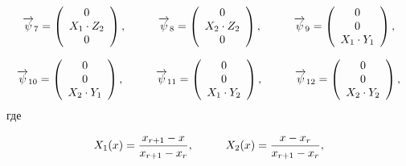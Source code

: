 \begin{equation*}
	\overrightarrow{\psi}_7 = \left(
	\begin{array}{c}
		0\\
		X_1 \cdot Z_2\\
		0\\
	\end{array}
	\right),
	\hspace{10mm}
	\overrightarrow{\psi}_8 = \left(
	\begin{array}{c}
		0\\
		X_2 \cdot Z_2\\
		0\\
	\end{array}
	\right),
	\hspace{10mm}
	\overrightarrow{\psi}_9 = \left(
	\begin{array}{c}
		0\\
		0\\
		X_1 \cdot Y_1\\
	\end{array}
	\right),
\end{equation*}

\begin{equation*}
	\overrightarrow{\psi}_{10} = \left(
	\begin{array}{c}
		0\\
		0\\
		X_2 \cdot Y_1\\	\end{array}
	\right),
	\hspace{10mm}
	\overrightarrow{\psi}_{11} = \left(
	\begin{array}{c}
		0\\
		0\\
		X_1 \cdot Y_2\\\end{array}
	\right),
	\hspace{10mm}
	\overrightarrow{\psi}_{12} = \left(
	\begin{array}{c}
		0\\
		0\\
		X_2 \cdot Y_2\\
	\end{array}
	\right),
\end{equation*}
где

\begin{equation*} \label{eq_2_37}
	X_1(x) = \frac{x_{r + 1} - x}{x_{r + 1} - x_r}, \hspace{10mm} X_2(x) = \frac{x - x_r}{x_{r + 1} - x_r},
\end{equation*}

